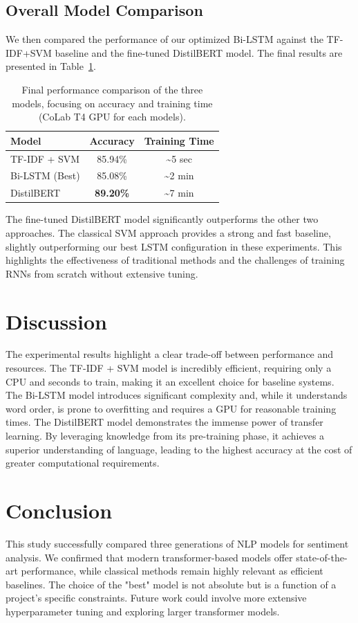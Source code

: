 \documentclass[11pt]{article}
\begin{document}
\subsection{Overall Model Comparison}
We then compared the performance of our optimized Bi-LSTM against the TF-IDF+SVM baseline and the fine-tuned DistilBERT model. The final results are presented in Table~\ref{tab:final-comparison}.

\begin{table}[h!]
\centering
\begin{tabular}{lcc}
\toprule
\textbf{Model} & \textbf{Accuracy} & \textbf{Training Time} \\
\midrule
TF-IDF + SVM & 85.94\% & \textasciitilde5 sec \\
Bi-LSTM (Best) & 85.08\% & \textasciitilde2 min \\
DistilBERT & \textbf{89.20\%} & \textasciitilde7 min \\
\bottomrule
\end{tabular}
\caption{Final performance comparison of the three models, focusing on accuracy and training time (CoLab T4 GPU for each models).}
\label{tab:final-comparison}
\end{table}

The fine-tuned DistilBERT model significantly outperforms the other two approaches. The classical SVM approach provides a strong and fast baseline, slightly outperforming our best LSTM configuration in these experiments. This highlights the effectiveness of traditional methods and the challenges of training RNNs from scratch without extensive tuning.

\section{Discussion}
The experimental results highlight a clear trade-off between performance and resources. The TF-IDF + SVM model is incredibly efficient, requiring only a CPU and seconds to train, making it an excellent choice for baseline systems. The Bi-LSTM model introduces significant complexity and, while it understands word order, is prone to overfitting and requires a GPU for reasonable training times. The DistilBERT model demonstrates the immense power of transfer learning. By leveraging knowledge from its pre-training phase, it achieves a superior understanding of language, leading to the highest accuracy at the cost of greater computational requirements.

\section{Conclusion}
This study successfully compared three generations of NLP models for sentiment analysis. We confirmed that modern transformer-based models offer state-of-the-art performance, while classical methods remain highly relevant as efficient baselines. The choice of the "best" model is not absolute but is a function of a project's specific constraints. Future work could involve more extensive hyperparameter tuning and exploring larger transformer models.
\end{document}
